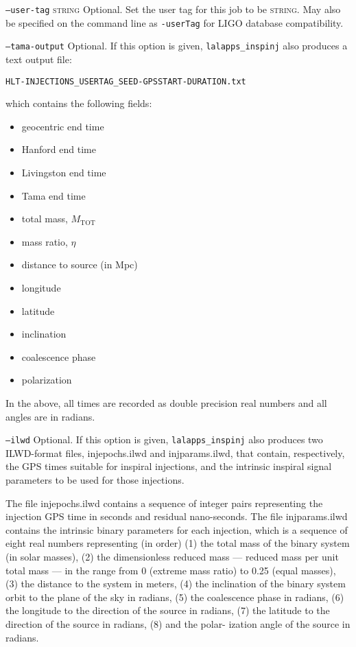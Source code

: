 \begin{entry}
\begin{entry}
\item[\texttt{--user-tag} \textsc{string}] Optional. Set the user tag for this
job to be \textsc{string}. May also be specified on the command line as 
\texttt{-userTag} for LIGO database compatibility.

\item[\texttt{--tama-output}]
Optional.  If this option is given, \verb+lalapps_inspinj+ also produces a 
text output file:
\begin{center}
\begin{verbatim}
HLT-INJECTIONS_USERTAG_SEED-GPSSTART-DURATION.txt
\end{verbatim}
\end{center}
which contains the following fields:

\begin{itemize}
\item geocentric end time
\item Hanford end time
\item Livingston end time
\item Tama end time
\item total mass, $M_{\mathrm{TOT}}$
\item mass ratio, $\eta$
\item distance to source (in Mpc)
\item longitude
\item latitude
\item inclination
\item coalescence phase
\item polarization
\end{itemize}

In the above, all times are recorded as double precision real numbers and all
angles are in radians.  

\item[\texttt{--ilwd}] Optional. If this option is given,
\verb+lalapps_inspinj+ also produces two ILWD-format files, injepochs.ilwd and
injparams.ilwd, that contain, respectively, the  GPS  times  suitable for
inspiral injections, and the intrinsic inspiral signal parameters to be used
for  those injections.

The  file  injepochs.ilwd  contains  a sequence of integer pairs representing
the injection GPS time in  seconds  and residual  nano-seconds.   The file
injparams.ilwd contains the intrinsic binary parameters for each injection,
which is  a  sequence  of  eight  real  numbers representing (in order) (1) the
total mass of the binary system  (in  solar masses),  (2)  the  dimensionless
reduced mass --- reduced mass per unit total mass --- in the range from  0
(extreme mass  ratio)  to  0.25 (equal masses), (3) the distance to the system
in meters, (4) the inclination  of  the  binary system  orbit  to the plane of
the sky in radians, (5) the coalescence phase in radians, (6)  the  longitude
to  the direction  of  the  source in radians, (7) the latitude to the
direction of the source in radians, (8) and the polar- ization angle of the
source in radians.
\end{entry}


\end{entry}
